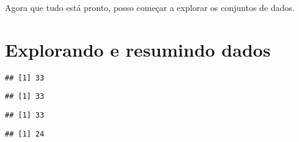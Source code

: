 \documentclass[
]{article}
\newenvironment{Shaded}{\begin{snugshade}}{\end{snugshade}}
\newcommand{\FunctionTok}[1]{\textcolor[rgb]{0.00,0.00,0.00}{#1}}
\newcommand{\NormalTok}[1]{#1}
\newcommand{\SpecialCharTok}[1]{\textcolor[rgb]{0.00,0.00,0.00}{#1}}
\begin{document}
Agora que tudo está pronto, posso começar a explorar os conjuntos de
dados.

\hypertarget{explorando-e-resumindo-dados}{%
\section{Explorando e resumindo
dados}\label{explorando-e-resumindo-dados}}

\begin{Shaded}
\end{Shaded}

\begin{verbatim}
## [1] 33
\end{verbatim}

\begin{Shaded}
\end{Shaded}

\begin{verbatim}
## [1] 33
\end{verbatim}

\begin{Shaded}
\end{Shaded}

\begin{verbatim}
## [1] 33
\end{verbatim}

\begin{Shaded}
\end{Shaded}

\begin{verbatim}
## [1] 24
\end{verbatim}

\begin{Shaded}
\end{Shaded}
\end{document}
